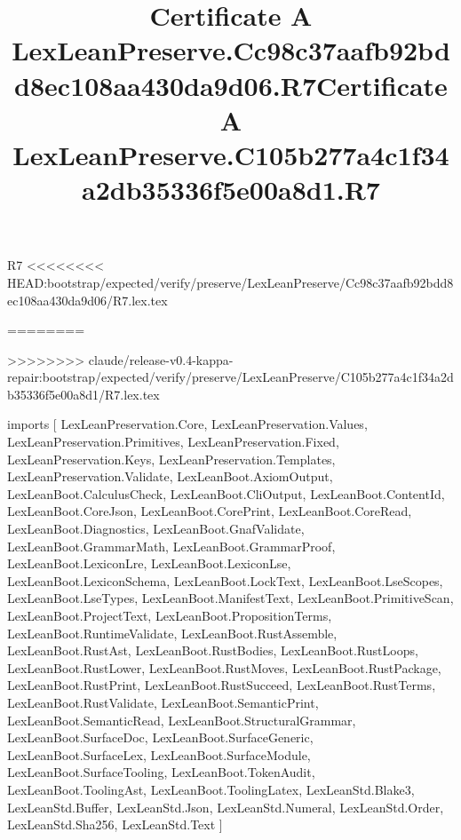 \begin{lexlean}{R7}
<<<<<<<< HEAD:bootstrap/expected/verify/preserve/LexLeanPreserve/Cc98c37aafb92bdd8ec108aa430da9d06/R7.lex.tex
\title{Certificate A LexLeanPreserve.Cc98c37aafb92bdd8ec108aa430da9d06.R7}
========
\title{Certificate A LexLeanPreserve.C105b277a4c1f34a2db35336f5e00a8d1.R7}
>>>>>>>> claude/release-v0.4-kappa-repair:bootstrap/expected/verify/preserve/LexLeanPreserve/C105b277a4c1f34a2db35336f5e00a8d1/R7.lex.tex
\begin{coremodule}
imports [
  LexLeanPreservation.Core,
  LexLeanPreservation.Values,
  LexLeanPreservation.Primitives,
  LexLeanPreservation.Fixed,
  LexLeanPreservation.Keys,
  LexLeanPreservation.Templates,
  LexLeanPreservation.Validate,
  LexLeanBoot.AxiomOutput,
  LexLeanBoot.CalculusCheck,
  LexLeanBoot.CliOutput,
  LexLeanBoot.ContentId,
  LexLeanBoot.CoreJson,
  LexLeanBoot.CorePrint,
  LexLeanBoot.CoreRead,
  LexLeanBoot.Diagnostics,
  LexLeanBoot.GnafValidate,
  LexLeanBoot.GrammarMath,
  LexLeanBoot.GrammarProof,
  LexLeanBoot.LexiconLre,
  LexLeanBoot.LexiconLse,
  LexLeanBoot.LexiconSchema,
  LexLeanBoot.LockText,
  LexLeanBoot.LseScopes,
  LexLeanBoot.LseTypes,
  LexLeanBoot.ManifestText,
  LexLeanBoot.PrimitiveScan,
  LexLeanBoot.ProjectText,
  LexLeanBoot.PropositionTerms,
  LexLeanBoot.RuntimeValidate,
  LexLeanBoot.RustAssemble,
  LexLeanBoot.RustAst,
  LexLeanBoot.RustBodies,
  LexLeanBoot.RustLoops,
  LexLeanBoot.RustLower,
  LexLeanBoot.RustMoves,
  LexLeanBoot.RustPackage,
  LexLeanBoot.RustPrint,
  LexLeanBoot.RustSucceed,
  LexLeanBoot.RustTerms,
  LexLeanBoot.RustValidate,
  LexLeanBoot.SemanticPrint,
  LexLeanBoot.SemanticRead,
  LexLeanBoot.StructuralGrammar,
  LexLeanBoot.SurfaceDoc,
  LexLeanBoot.SurfaceGeneric,
  LexLeanBoot.SurfaceLex,
  LexLeanBoot.SurfaceModule,
  LexLeanBoot.SurfaceTooling,
  LexLeanBoot.TokenAudit,
  LexLeanBoot.ToolingAst,
  LexLeanBoot.ToolingLatex,
  LexLeanStd.Blake3,
  LexLeanStd.Buffer,
  LexLeanStd.Json,
  LexLeanStd.Numeral,
  LexLeanStd.Order,
  LexLeanStd.Sha256,
  LexLeanStd.Text
]


\end{coremodule}
\end{lexlean}
